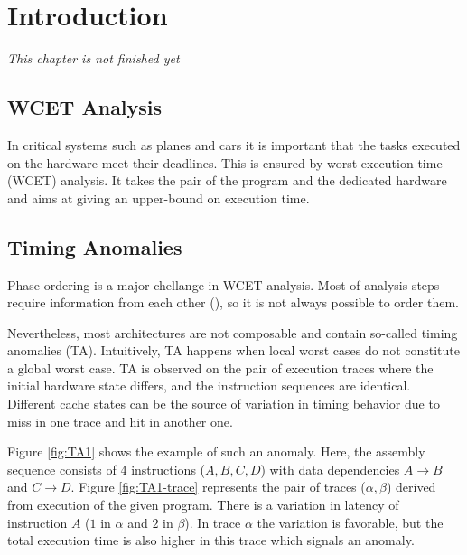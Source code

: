 \chapter{Introduction}

\textit{This chapter is not finished yet}

\section{WCET Analysis}

In critical systems such as planes and cars it is important that the tasks executed on the hardware meet their deadlines. This is ensured by worst execution time (WCET) analysis. It takes the pair of the program and the dedicated hardware and aims at giving an upper-bound on execution time. 


\section{Timing Anomalies}

Phase ordering is a major chellange in WCET-analysis. Most of analysis steps require information from each other (), so it is not always possible to order them. 

Nevertheless, most architectures are not composable and contain so-called timing anomalies (TA). Intuitively, TA happens when local worst cases do not constitute a global worst case. TA is observed on the pair of execution traces where the initial hardware state differs, and the instruction sequences are identical. Different cache states can be the source of variation in timing behavior due to miss in one trace and hit in another one.

\begin{example}
Figure \ref{fig:TA1} shows the example of such an anomaly. Here, the assembly sequence consists of 4 instructions ($A,B,C,D$) with data dependencies $A \rightarrow B$ and $C \rightarrow D$. Figure \ref{fig:TA1-trace} represents the pair of traces ($\alpha, \beta$) derived from execution of the given program. There is a variation in latency of instruction $A$ ($1$ in $\alpha$ and $2$ in $\beta$). In trace $\alpha$  the variation is favorable, but the total execution time is also higher in this trace which signals an anomaly.

\label{ex:simple-ta}
\end{example}

